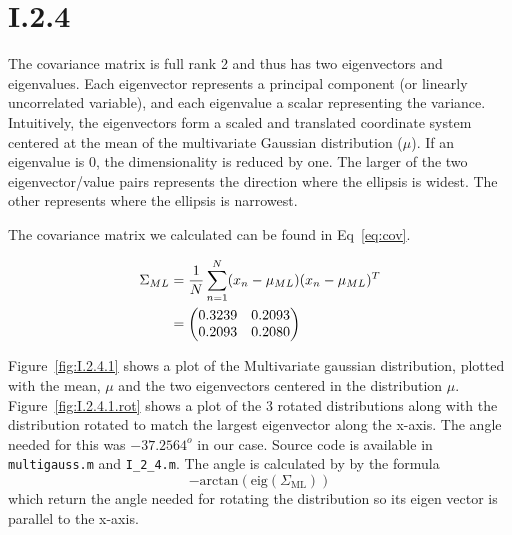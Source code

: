 \FloatBarrier
\section*{I.2.4}
The covariance matrix is full rank 2 and thus has two eigenvectors and
eigenvalues. Each eigenvector represents a principal component (or linearly
uncorrelated variable), and each eigenvalue a scalar representing the variance.
Intuitively, the eigenvectors form a scaled and translated coordinate system
centered at the mean of the multivariate Gaussian distribution ($\mu$). If an
eigenvalue is 0, the dimensionality is reduced by one. The larger of the two
eigenvector/value pairs represents the direction where the ellipsis is widest.
The other represents where the ellipsis is narrowest.

The covariance matrix we calculated can be found in Eq~\ref{eq:cov}.


\begin{align}
	\Sigma_{ML} &= \frac{1}{N} \sum_{n=1}^N (x_n - \mu_{ML}) (x_n - \mu_{ML})^T \notag \\
	&= \begin{pmatrix}
		0.3239 & 0.2093 \\
		0.2093 & 0.2080
	\end{pmatrix} \label{eq:cov}
\end{align}

Figure~\ref{fig:I.2.4.1} shows a plot of the Multivariate gaussian distribution,
plotted with the mean, $\mu$ and the two eigenvectors centered in the
distribution $\mu$. Figure~\ref{fig:I.2.4.1.rot} shows a plot of the 3 rotated
distributions along with the distribution rotated to match the largest
eigenvector along the x-axis. The angle needed for this was $-37.2564^o$ in our
case. Source code is available in \texttt{multigauss.m} and \texttt{I\_2\_4.m}.
The angle is calculated by by the formula
\[-\text{arctan}(\text{eig}(\Sigma_{\text{ML}}))\] which return the angle needed
for rotating the distribution so its eigen vector is parallel to the x-axis.


